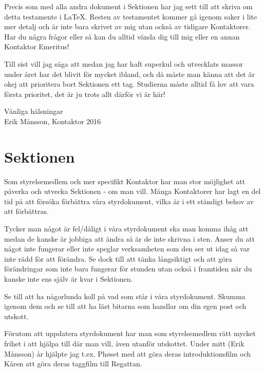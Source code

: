 \documentclass[10pt]{article}
\begin{document}
Precis som med alla andra dokument i Sektionen har jag sett till att skriva om detta testamente i \LaTeX. Resten av testamentet kommer gå igenom saker i lite mer detalj och är inte bara skrivet av mig utan också av tidigare Kontaktorer. Har du några frågor eller så kan du alltid vända dig till mig eller en annan Kontaktor Emeritus!

Till sist vill jag säga att medan jag har haft superkul och utvecklats massor under året har det blivit för mycket ibland, och då måste man känna att det är okej att prioritera bort Sektionen ett tag. Studierna måste alltid få lov att vara första prioritet, det är ju trots allt därför vi är här!

\begin{itshape}
Vänliga hälsningar\\
Erik Månsson, Kontaktor 2016\\
\end{itshape}

\newpage

\tableofcontents
\newpage

\section{Sektionen}
Som styrelsemedlem och mer specifikt Kontaktor har man stor möjlighet att påverka och utvecka Sektionen - om man vill. Många Kontaktorer har lagt en del tid på att försöka förbättra våra styrdokument, vilka är i ett ständigt behov av att förbättras.

Tycker man något är fel/dåligt i våra styrdokument ska man komma ihåg att medan de kanske är jobbiga att ändra så är de inte skrivna i sten. Anser du att något inte fungerar eller inte speglar verksamheten som den ser ut idag så var inte rädd för att förändra. Se dock till att tänka långsiktigt och att göra förändringar som inte bara fungerar för stunden utan också i framtiden när du kanske inte ens själv är kvar i Sektionen.

Se till att ha någorlunda koll på vad som står i våra styrdokument. Skumma igenom dem och se till att ha läst bitarna som handlar om din egen post och utskott.

Förutom att uppdatera styrdokument har man som styrelsemedlem rätt mycket frihet i att hjälpa till där man vill, även utanför utskottet. Under mitt (Erik Månsson) år hjälpte jag t.ex. Ph\o set med att göra deras introduktionsfilm och Kåren att göra deras taggfilm till Regattan.
\end{document}
